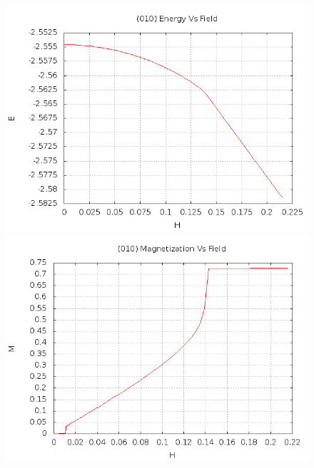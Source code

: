 \documentclass{article}
\begin{document}
\begin{figure}[ht]
\centering
\includegraphics[scale=0.3]{HVariedData/Increasing/010Einc.png}
\includegraphics[scale=0.3]{HVariedData/Increasing/010Minc.png}
\end{figure}
\end{document}
